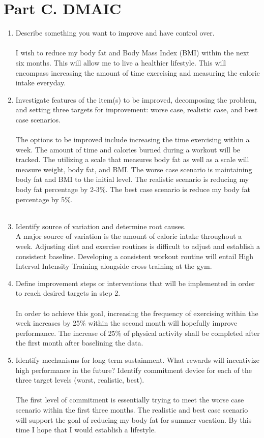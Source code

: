 \documentclass[12pt,letterpaper]{article}
\begin{document}
\section*{Part C. DMAIC}
    \begin{enumerate}
        \item Describe something you want to improve and have control over.\\\\
    I wish to reduce my body fat and Body Mass Index (BMI) within the next six months. This will allow me to live a healthier lifestyle. This will encompass increasing the amount of time exercising and measuring the caloric intake everyday. 
        \item Investigate features of the item(s) to be improved, decomposing the problem, and setting three targets for improvement: worse case, realistic case, and best case scenarios.\\\\
    The options to be improved include increasing the time exercising within a week. The amount of time and calories burned during a workout will be tracked. The utilizing a scale that measures body fat as well as a scale will measure weight, body fat, and BMI. The worse case scenario is maintaining body fat and BMI to the initial level. The realistic scenario is reducing my body fat percentage by 2-3\%. The best case scenario is reduce my body fat percentage by 5\%.\\ \\ 
        \item Identify source of variation and determine root causes.\\
    A major source of variation is the amount of caloric intake throughout a week. Adjusting diet and exercise routines is difficult to adjust and establish a consistent baseline. Developing a consistent workout routine will entail High Interval Intensity Training alongside cross training at the gym.\\ 
        \item Define improvement steps or interventions that will be implemented in order to reach desired targets in step 2.\\\\
    In order to achieve this goal, increasing the frequency of exercising within the week increases by 25\% within the second month will hopefully improve performance. The increase of 25\% of physical activity shall be completed after the first month after baselining the data.\\ 
        \item Identify mechanisms for long term sustainment. What rewards will incentivize high performance in the future? Identify commitment device for each of the three target levels (worst, realistic, best).\\\\
    The first level of commitment is essentially trying to meet the worse case scenario within the first three months. The realistic and best case scenario will support the goal of reducing my body fat for summer vacation. By this time I hope that I would establish a lifestyle. 
    \end{enumerate}
\end{document}
